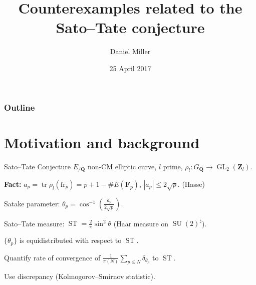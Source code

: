 \documentclass{beamer}
\title{Counterexamples related to the Sato--Tate conjecture}
\author{Daniel Miller}
\institute{Cornell University}
\date{25 April 2017}
\DeclareMathOperator{\GL}{GL}
\DeclareMathOperator{\ST}{ST}
\DeclareMathOperator{\SU}{SU}
\DeclareMathOperator{\tr}{tr}
\newcommand{\bF}{\mathbf{F}}
\newcommand{\bQ}{\mathbf{Q}}
\newcommand{\bZ}{\mathbf{Z}}
\newcommand{\frob}{\mathrm{fr}}
\begin{document}
\begin{frame}
\titlepage
\end{frame}



\begin{frame}
\frametitle{Outline}
\tableofcontents
\end{frame}





\section{Motivation and background}

\begin{frame}{Sato--Tate Conjecture}
$E_{/\bQ}$ non-CM elliptic curve, $l$ prime, $\rho_l\colon G_\bQ \to \GL_2(\bZ_l)$. 
\pause

\textbf{Fact:}
$a_p = \tr\rho_l(\frob_p) = p+1 - \# E(\bF_p)$, 
\pause
$|a_p|\leqslant 2\sqrt p$. 
\pause
(Hasse) %
\pause

Satake parameter: $\theta_p = \cos^{-1}\left( \frac{a_p}{2\sqrt p}\right)$. 
\pause

Sato--Tate measure: $\ST = \frac{2}{\pi} \sin^2 \theta$ 
\pause
(Haar measure on $\SU(2)^\natural$). 
\pause

\begin{theorem}[Taylor et.~al.]
$\{\theta_p\}$ is equidistributed with respect to $\ST$. 
\end{theorem}
\pause

Quantify rate of convergence of 
$\frac{1}{\pi(N)} \sum_{p\leqslant N} \delta_{\theta_p}$ to $\ST$. 
\pause

Use discrepancy (Kolmogorov--Smirnov statistic). 
\end{frame}
\end{document}
